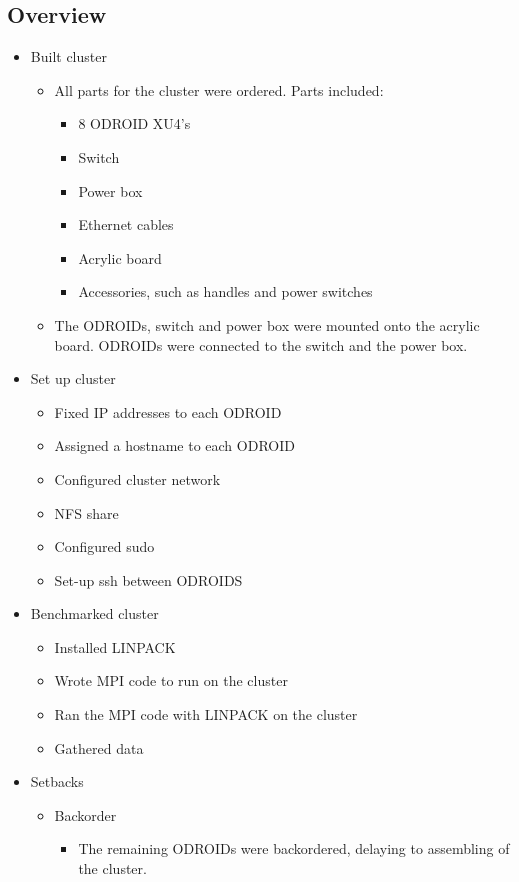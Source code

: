 \subsection{Overview}
\begin{itemize}
	\item Built cluster
	\begin{itemize}
		\item All parts for the cluster were ordered. Parts included:
		\begin{itemize}
			\item 8 ODROID XU4's
			\item Switch
			\item Power box
			\item Ethernet cables
			\item Acrylic board
			\item Accessories, such as handles and power switches
		\end{itemize}
		\item The ODROIDs, switch and power box were mounted onto the acrylic board. ODROIDs were connected to the switch and the power box.
	\end{itemize}
	\item Set up cluster
	\begin{itemize}
		\item Fixed IP addresses to each ODROID
		\item Assigned a hostname to each ODROID
		\item Configured cluster network
		\item NFS share
		\item Configured sudo
		\item Set-up ssh between ODROIDS
	\end{itemize}
	\item Benchmarked cluster
	\begin{itemize}
		\item Installed LINPACK
		\item Wrote MPI code to run on the cluster
		\item Ran the MPI code with LINPACK on the cluster
		\item Gathered data
	\end{itemize}
	\item Setbacks
	\begin{itemize}
		\item Backorder
		\begin{itemize}
			\item The remaining ODROIDs were backordered, delaying to assembling of the cluster.

\end{itemize}
\end{itemize}
\end{itemize}
